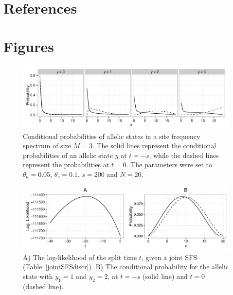 \documentclass[preprint]{elsarticle}
\begin{document}
\section*{References}



\newpage

\section*{Figures}

\begin{figure}[ht]
\includegraphics[width = 12cm]{cProb.pdf}
\caption{Conditional probabilities of allelic states in a site frequency spectrum of size $M=3$. The solid lines represent the conditional probabilities of an allelic state $y$ at $t=-s$, while the dashed lines represent the probabilities at $t=0$. The parameters were set to $\theta_a=0.05$, $\theta_c=0.1$, $s=200$ and $N=20$.}\label{cProb}
\end{figure}

\begin{figure}[ht]
\includegraphics[width = 12cm]{twoPop_14_7_2016.pdf}
\caption{A) The log-likelihood of the split time $t$, given a joint SFS (Table~\ref{jointSFSdiscr}). B) The conditional probability for the allelic state with $y_1=1$ and $y_2=2$, at $t=-s$ (solid line) and $t=0$ (dashed line).}\label{twoPopdiscr}
\end{figure}
\end{document}
